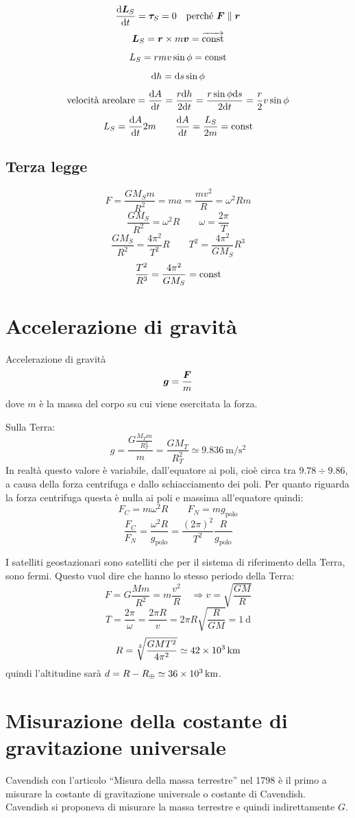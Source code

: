 \[
  \frac{\mathrm{d}\boldsymbol{L}_S}{\mathrm{d} t}=\boldsymbol{\tau}_S=0\quad\text{perché }\boldsymbol{F}\parallel\boldsymbol{r}
\]
\[\boldsymbol{L}_S=\boldsymbol{r}\times m\boldsymbol{v}=\overrightarrow{\text{const}}\]
\[L_S=rmv\sin\phi={\text{const}}\]
\[\mathrm{d} h=\mathrm{d} s\sin\phi\]
\[
  \text{velocità areolare}=\frac{\mathrm{d} A}{\mathrm{d} t}=\frac{r\mathrm{d} h}{2\mathrm{d}
    t}=\frac{r\sin\phi\mathrm{d} s}{2\mathrm{d} t}=\frac{r}{2}v\sin\phi
\]
\[L_S=\frac{\mathrm{d} A}{\mathrm{d} t}2m\qquad\frac{\mathrm{d} A}{\mathrm{d}
    t}=\frac{L_S}{2m}=\text{const}\]
\subsection{Terza legge}
\[F=\frac{GM_Sm}{R^2}=ma=\frac{mv^2}{R}=\omega^2Rm\]
\[\frac{GM_S}{R^2}=\omega^2R\qquad \omega=\frac{2\pi}{T}\]
\[\frac{GM_S}{R^2}=\frac{4\pi^2}{T^2}R\qquad
  T^2=\frac{4\pi^2}{GM_S}R^3\]
\[\frac{T^2}{R^3}=\frac{4\pi^2}{GM_S}=\text{const}\]

\section{Accelerazione di gravità}
\begin{Def}{Accelerazione di gravità}
  \[\boldsymbol{g}=\frac{\boldsymbol{F}}{m}\]
  dove $m$ è la massa del corpo su cui viene esercitata la forza.
\end{Def}
Sulla Terra: \[g = \frac{G\frac{M_Tm}{R_T^2}}{m}=\frac{GM_T}{R_T^2}\simeq \SI{9.836}{\meter\per\second\squared} \]
In realtà questo valore è variabile, dall'equatore ai poli, cioè
circa tra $9.78\div9.86$, a causa della forza centrifuga e dallo
schiacciamento dei poli. Per quanto riguarda la forza centrifuga
questa è nulla ai poli e massima all'equatore quindi:
\[F_C=m\omega^2R\qquad F_N=mg_{\text{polo}}\]
\[\frac{F_C}{F_N}=\frac{\omega^2R}{g_{\text{polo}}}=\frac{(2\pi)^2}{T^2}\frac{R}{g_{\text{polo}}}\]
\begin{Es}
  I satelliti geostazionari sono satelliti che per il sistema di riferimento della Terra, sono fermi. Questo vuol dire che hanno lo stesso periodo della Terra:
  \[
    F = G\frac{Mm}{R^2} = m\frac{v^2}{R}\quad\Rightarrow v=\sqrt{\frac{GM}{R}}
  \]
  \[
    T = \frac{2 \pi}{\omega} = \frac{2\pi R}{v} = 2\pi R\sqrt{\frac{R}{GM}} = \SI{1}{\day}
  \]
  \[
    R = \sqrt[3]{\frac{GMT^2}{4\pi^2}}\simeq \SI{42E3}{\kilo\meter}
  \]
  quindi l'altitudine sarà $d = R - R_\oplus\simeq \SI{36E3}{\kilo\meter}$.
\end{Es}

\section{Misurazione della costante di gra\-vi\-ta\-zio\-ne u\-ni\-ver\-sa\-le}
Cavendish con l'articolo ``Misura della massa terrestre'' nel
1798 è il primo a misurare la costante di gravitazione universale
o costante di Cavendish. Cavendish si proponeva di misurare la
massa terrestre e quindi indirettamente $G$.

